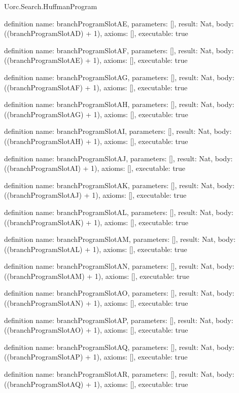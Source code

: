 \begin{lexlean}{Uorc.Search.HuffmanProgram}
\begin{semanticmodule}
definition{
  name: branchProgramSlotAE,
  parameters: [],
  result: Nat,
  body: ((branchProgramSlotAD) + 1),
  axioms: [],
  executable: true
}

definition{
  name: branchProgramSlotAF,
  parameters: [],
  result: Nat,
  body: ((branchProgramSlotAE) + 1),
  axioms: [],
  executable: true
}

definition{
  name: branchProgramSlotAG,
  parameters: [],
  result: Nat,
  body: ((branchProgramSlotAF) + 1),
  axioms: [],
  executable: true
}

definition{
  name: branchProgramSlotAH,
  parameters: [],
  result: Nat,
  body: ((branchProgramSlotAG) + 1),
  axioms: [],
  executable: true
}

definition{
  name: branchProgramSlotAI,
  parameters: [],
  result: Nat,
  body: ((branchProgramSlotAH) + 1),
  axioms: [],
  executable: true
}

definition{
  name: branchProgramSlotAJ,
  parameters: [],
  result: Nat,
  body: ((branchProgramSlotAI) + 1),
  axioms: [],
  executable: true
}

definition{
  name: branchProgramSlotAK,
  parameters: [],
  result: Nat,
  body: ((branchProgramSlotAJ) + 1),
  axioms: [],
  executable: true
}

definition{
  name: branchProgramSlotAL,
  parameters: [],
  result: Nat,
  body: ((branchProgramSlotAK) + 1),
  axioms: [],
  executable: true
}

definition{
  name: branchProgramSlotAM,
  parameters: [],
  result: Nat,
  body: ((branchProgramSlotAL) + 1),
  axioms: [],
  executable: true
}

definition{
  name: branchProgramSlotAN,
  parameters: [],
  result: Nat,
  body: ((branchProgramSlotAM) + 1),
  axioms: [],
  executable: true
}

definition{
  name: branchProgramSlotAO,
  parameters: [],
  result: Nat,
  body: ((branchProgramSlotAN) + 1),
  axioms: [],
  executable: true
}

definition{
  name: branchProgramSlotAP,
  parameters: [],
  result: Nat,
  body: ((branchProgramSlotAO) + 1),
  axioms: [],
  executable: true
}

definition{
  name: branchProgramSlotAQ,
  parameters: [],
  result: Nat,
  body: ((branchProgramSlotAP) + 1),
  axioms: [],
  executable: true
}

definition{
  name: branchProgramSlotAR,
  parameters: [],
  result: Nat,
  body: ((branchProgramSlotAQ) + 1),
  axioms: [],
  executable: true
}


\end{semanticmodule}
\end{lexlean}

